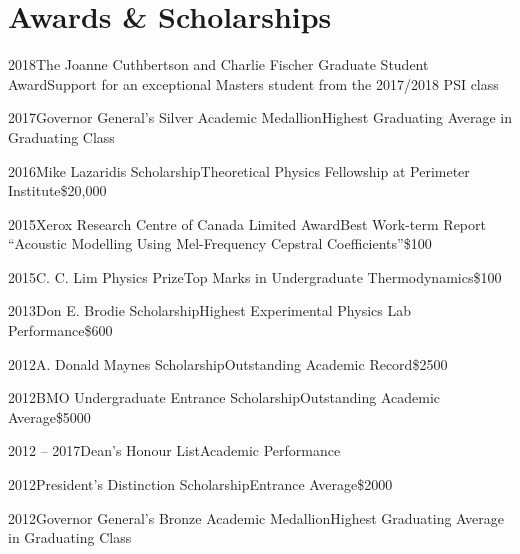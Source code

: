 \documentclass{article}
\begin{document}
    \section{Awards \& Scholarships}
    \begin{awardlist}
        \item{2018}{The Joanne Cuthbertson and Charlie Fischer Graduate Student Award}{Support for an exceptional Masters student from the 2017/2018 PSI class}{}
        \item{2017}{Governor General's Silver Academic Medallion}{Highest Graduating Average in Graduating Class}{}
        \item{2016}{Mike Lazaridis Scholarship}{Theoretical Physics Fellowship at Perimeter Institute}{\$20,000}
        \item{2015}{Xerox Research Centre of Canada Limited Award}{Best Work-term Report ``Acoustic Modelling Using Mel-Frequency Cepstral Coefficients''}{\$100}
        \item{2015}{C. C. Lim Physics Prize}{Top Marks in Undergraduate Thermodynamics}{\$100}
        \item{2013}{Don E. Brodie Scholarship}{Highest Experimental Physics Lab Performance}{\$600}
        \item{2012}{A. Donald Maynes Scholarship}{Outstanding Academic Record}{\$2500}
        \item{2012}{BMO Undergraduate Entrance Scholarship}{Outstanding Academic Average}{\$5000}
        \item{2012 -- 2017}{Dean's Honour List}{Academic Performance}{}
        \item{2012}{President's Distinction Scholarship}{Entrance Average}{\$2000}
        \item{2012}{Governor General's Bronze Academic Medallion}{Highest Graduating Average in Graduating Class}{}
    \end{awardlist}
    \clearpage
\end{document}
